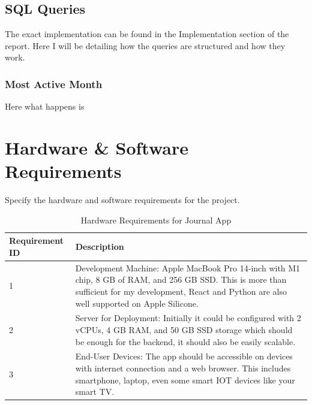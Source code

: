 \subsection{SQL Queries}
The exact implementation can be found in the Implementation section of the report. Here I will be detailing how the queries are structured and how they work.

\subsubsection{Most Active Month}
Here what happens is 


\section{Hardware \& Software Requirements}
Specify the hardware and software requirements for the project.

\begin{table}[H]
    \centering
    \begin{tabular}{|l|p{10cm}|}
    \hline
    \textbf{Requirement ID} & \textbf{Description} \\ \hline
    1 & Development Machine: Apple MacBook Pro 14-inch with M1 chip, 8 GB of RAM, and 256 GB SSD. This is more than sufficient for my development, React and Python are also well supported on Apple Silicone. \\ \hline
    2 & Server for Deployment: Initially it could be configured with 2 vCPUs, 4 GB RAM, and 50 GB SSD storage which should be enough for the backend, it should also be easily scalable. \\ \hline
    3 & End-User Devices: The app should be accessible on devices with internet connection and a web browser. This includes smartphone, laptop, even some smart IOT devices like your smart TV. \\ \hline
    \end{tabular}
    \caption{Hardware Requirements for Journal App}
    \end{table}

